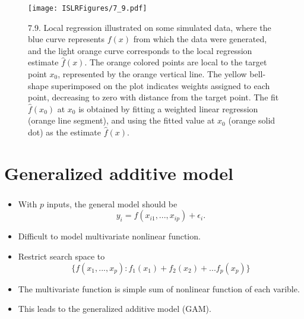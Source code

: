 \documentclass{beamer}
\begin{document}
                           \begin{frame}
                           	\begin{figure}
                           		\centering
                           		
                           		\centering
                           		\texttt{[image: ISLRFigures/7\_9.pdf]}
                           		\caption{\scriptsize 7.9. Local regression illustrated on some simulated data, where the
                           			blue curve represents $f(x)$ from which the data were generated, and the light
                           			orange curve corresponds to the local regression estimate $\hat f(x)$. The orange colored
                           			points are local to the target point $x_0$, represented by the orange vertical line.
                           			The yellow bell-shape superimposed on the plot indicates weights assigned to each
                           			point, decreasing to zero with distance from the target point. The fit$\hat f(x_0)$ at 
                           			$x_0$ is
                           			obtained by fitting a weighted linear regression (orange line segment), and using
                           			the fitted value at $x_0$ (orange solid dot) as the estimate $\hat f(x)$.
                           		}
                           	\end{figure}
                           \end{frame}
\section{Generalized additive model}

\begin{frame}
	\frametitle{  }
	\begin{itemize}
		
		\item  With $p$ inputs, the general model should be
		$$ y_i = f(x_{i1}, ..., x_{ip}) + \epsilon_i.$$  
		\item  Difficult to model multivariate nonlinear function.
		\item  Restrict  search space to 
		$$\{ f(x_1, ..., x_p): f_1(x_1) + f_2(x_2) + ... f_p(x_p) \}$$
		\item The multivariate function is simple sum of nonlinear function of each varible. 
		\item This leads to the generalized additive model (GAM).
	\end{itemize}
\end{frame}
\end{document}
